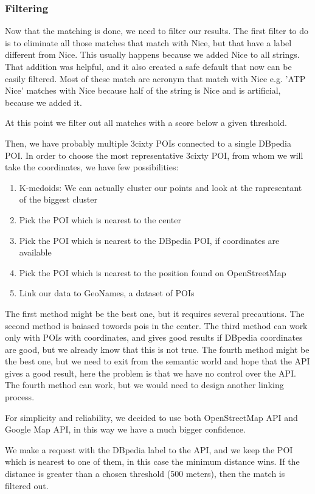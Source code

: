 \subsubsection{Filtering}
Now that the matching is done, we need to filter our results.
The first filter to do is to eliminate all those matches that match with Nice, but that have a label different from Nice. This usually happens because we added Nice to all strings. That addition was helpful, and it also created a safe default that now can be easily filtered.
Most of these match are acronym that match with Nice e.g. 'ATP Nice' matches with Nice because half of the string is Nice and is artificial, because we added it.

At this point we filter out all matches with a score below a given threshold.

Then, we have probably multiple 3cixty POIs connected to a single DBpedia POI.
In order to choose the most representative 3cixty POI, from whom we will take the coordinates, we have few possibilities:
\begin{enumerate}
\item K-medoids: We can actually cluster our points and look at the rapresentant of the biggest cluster 
\item Pick the POI which is nearest to the center
\item Pick the POI which is nearest to the DBpedia POI, if coordinates are available
\item Pick the POI which is nearest to the position found on OpenStreetMap
\item Link our data to GeoNames, a dataset of POIs
\end{enumerate}
The first method might be the best one, but it requires several precautions.
The second method is baiased towords pois in the center.
The third method can work only with POIs with coordinates, and gives good results if DBpedia coordinates are good, but we already know that this is not true.
The fourth method might be the best one, but we need to exit from the semantic world and hope that the API gives a good result, here the problem is that we have no control over the API.
The fourth method can work, but we would need to design another linking process.

For simplicity and reliability, we decided to use both OpenStreetMap API and Google Map API, in this way we have a much bigger confidence.

We make a request with the DBpedia label to the API, and we keep the POI which is nearest to one of them, in this case the minimum distance wins. If the distance is greater than a chosen threshold (500 meters), then the match is filtered out. 

